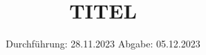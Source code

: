 

\subject{VERSUCH NUMMER}
\title{TITEL}
\date{%
  Durchführung: 28.11.2023
  \hspace{3em}
  Abgabe: 05.12.2023
}



\maketitle
\thispagestyle{empty}
\tableofcontents
\newpage


%
%
%

\printbibliography{}
\appendix
\setcounter{secnumdepth}{0}

